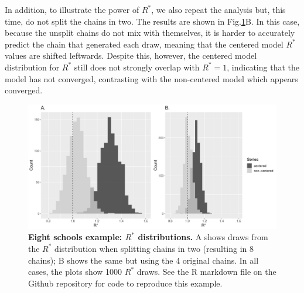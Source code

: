 \documentclass{article}
\begin{document}
In addition, to illustrate the power of $R^*$, we also repeat the analysis but, this time, do not split the chains in two. The results are shown in Fig.\ref{fig:eight_schools}B. In this case, because the unsplit chains do not mix with themselves, it is harder to accurately predict the chain that generated each draw, meaning that the centered model $R^*$ values are shifted leftwards. Despite this, however, the centered model distribution for $R^*$ still does not strongly overlap with $R^*=1$, indicating that the model has not converged, contrasting with the non-centered model which appears converged.

\begin{figure}[!htb]
	\centerline{\includegraphics[width=1.0\textwidth]{../output/eight_schools.pdf}}
	\caption{\textbf{Eight schools example: $R^*$ distributions.} A shows draws from the $R^*$ distribution when splitting chains in two (resulting in 8 chains); B shows the same but using the 4 original chains. In all cases, the plots show 1000 $R^*$ draws. See the R markdown file on the Github repository for code to reproduce this example.}
	\label{fig:eight_schools}
\end{figure}
\end{document}
